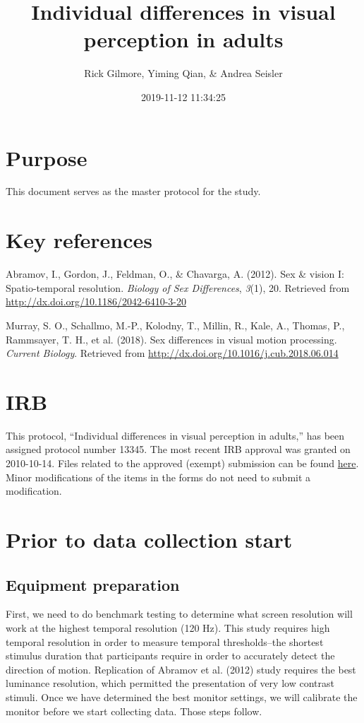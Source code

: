 \documentclass[]{article}
\title{Individual differences in visual perception in adults}
\author{Rick Gilmore, Yiming Qian, \& Andrea Seisler}
\date{2019-11-12 11:34:25}
\begin{document}
\maketitle

{
\setcounter{tocdepth}{5}
\tableofcontents
}
\section{Purpose}\label{purpose}

This document serves as the master protocol for the study.

\section{Key references}\label{key-references}

Abramov, I., Gordon, J., Feldman, O., \& Chavarga, A. (2012). Sex \&
vision I: Spatio-temporal resolution. \emph{Biology of Sex Differences},
\emph{3}(1), 20. Retrieved from
\url{http://dx.doi.org/10.1186/2042-6410-3-20}

Murray, S. O., Schallmo, M.-P., Kolodny, T., Millin, R., Kale, A.,
Thomas, P., Rammsayer, T. H., et al. (2018). Sex differences in visual
motion processing. \emph{Current Biology}. Retrieved from
\url{http://dx.doi.org/10.1016/j.cub.2018.06.014}

\section{IRB}\label{irb}

This protocol, ``Individual differences in visual perception in
adults,'' has been assigned protocol number 13345. The most recent IRB
approval was granted on 2010-10-14. Files related to the approved
(exempt) submission can be found \href{../irb/2019-10-24}{here}. Minor
modifications of the items in the forms do not need to submit a
modification.

\section{Prior to data collection
start}\label{prior-to-data-collection-start}

\subsection{Equipment preparation}\label{equipment-preparation}

First, we need to do benchmark testing to determine what screen
resolution will work at the highest temporal resolution (120 Hz). This
study requires high temporal resolution in order to measure temporal
thresholds--the shortest stimulus duration that participants require in
order to accurately detect the direction of motion. Replication of
Abramov et al. (2012) study requires the best luminance resolution,
which permitted the presentation of very low contrast stimuli. Once we
have determined the best monitor settings, we will calibrate the monitor
before we start collecting data. Those steps follow.
\end{document}
